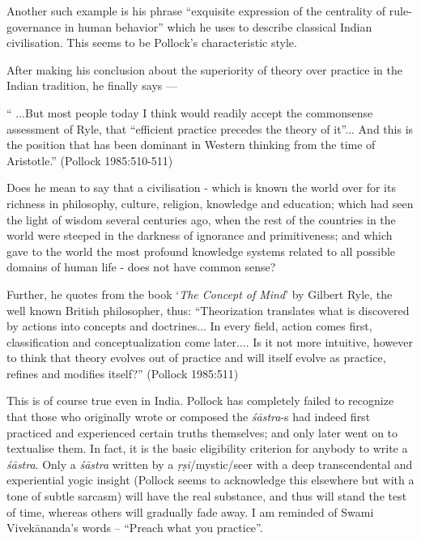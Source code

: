 Another such example is his phrase ``exquisite expression of the centrality of rule-governance in human behavior'' which he uses to describe classical Indian civilisation. This seems to be Pollock's characteristic style. 

After making his conclusion about the superiority of theory over practice in the Indian tradition, he finally says ---
\begin{myquote}
`` ...But most people today I think would readily accept the commonsense assessment of Ryle, that ``efficient practice precedes the theory of it''... And this is the position that has been dominant in Western thinking from the time of Aristotle.''   (Pollock 1985:510-511)
\end{myquote}

Does he mean to say that a civilisation - which is known the world over for its richness in philosophy, culture, religion, knowledge and education; which had seen the light of wisdom several centuries ago, when the rest of the countries in the world were steeped in the darkness of ignorance and primitiveness; and which gave to the world the most profound knowledge systems related to all possible domains of human life - does not have common sense?

Further, he quotes from the book `\textit{The Concept of Mind}' by Gilbert Ryle, the well known British philosopher, thus: ``Theorization translates what is discovered by actions into concepts and doctrines... In every field, action comes first, classification and conceptualization come later.... Is it not more intuitive, however to think that theory evolves out of practice and will itself evolve as practice, refines and modifies itself?'' (Pollock 1985:511)

This is of course true even in India. Pollock has completely failed to recognize that those who originally wrote or composed the {\it śāstra}-s had indeed first practiced and experienced certain truths themselves; and only later went on to textualise them. In fact, it is the basic eligibility criterion for anybody to write a {\it śāstra}. Only a {\it śāstra} written by a {\it ṛṣi}/mystic/seer with a deep transcendental and experiential yogic insight (Pollock seems to acknowledge this elsewhere but with a tone of subtle sarcasm) will have the real substance, and thus will stand the test of time, whereas others will gradually fade away. I am reminded of Swami Vivekānanda's  words -- ``Preach what you practice''.

